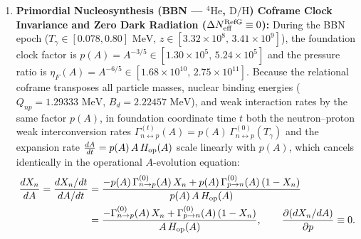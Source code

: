 \documentclass[11pt,a4paper]{article}
\begin{document}
\begin{enumerate}[label=\arabic*.]
\begin{equation}
\gamma(\Omega_m) = \frac{6}{11} + \frac{15}{2057}\bigl(1 - \Omega_m(A)\bigr) + \mathcal{O}\bigl((1 - \Omega_m)^2\bigr),
\end{equation}
with leading coefficient $\gamma_0 = \frac{6}{11} \approx 0.54545$ and first correction $\gamma_1 = \frac{15}{2057} \approx 0.007292$. At $z=0$, $\gamma(\Omega_{m0}) = 0.55045$, $f(0) = 0.52728$, and the redshift-space distortion (RSD) parameter is $f\sigma_8(0) = 0.42768$ ($\sigma_{8,0} = 0.8111$), matching SDSS/BOSS/eBOSS observations over $z \in [0.15, 1.48]$ with $\chi^2/\text{dof} = 1.179$.
\item \textbf{Primordial Nucleosynthesis (BBN --- $^4\mathrm{He}$, $\mathrm{D/H}$) Coframe Clock Invariance and Zero Dark Radiation ($\Delta N_{\rm eff}^{\rm RefG} \equiv 0$):} During the BBN epoch ($T_\gamma \in [0.078, 0.80]\text{ MeV}$, $z \in [3.32\times 10^8,\, 3.41\times 10^9]$), the foundation clock factor is $p(A) = A^{-3/5} \in [1.30\times 10^5,\, 5.24\times 10^5]$ and the pressure ratio is $\eta_F(A) = A^{-6/5} \in [1.68\times 10^{10},\, 2.75\times 10^{11}]$. Because the relational coframe transposes all particle masses, nuclear binding energies ($Q_{np} = 1.29333\text{ MeV}$, $B_d = 2.22457\text{ MeV}$), and weak interaction rates by the same factor $p(A)$, in foundation coordinate time $t$ both the neutron--proton weak interconversion rates $\Gamma_{n\leftrightarrow p}^{(t)}(A) = p(A)\,\Gamma_{n\leftrightarrow p}^{(0)}(T_\gamma)$ and the expansion rate $\frac{dA}{dt} = p(A)\,A\,H_{\rm op}(A)$ scale linearly with $p(A)$, which cancels identically in the operational $A$-evolution equation:
\begin{align}
\frac{dX_n}{dA}
= \frac{dX_n/dt}{dA/dt}
&= \frac{-p(A)\,\Gamma_{n\to p}^{(0)}(A)\,X_n + p(A)\,\Gamma_{p\to n}^{(0)}(A)\,(1 - X_n)}{p(A)\,A\,H_{\rm op}(A)} \nonumber\\
&= \frac{-\Gamma_{n\to p}^{(0)}(A)\,X_n + \Gamma_{p\to n}^{(0)}(A)\,(1 - X_n)}{A\,H_{\rm op}(A)},
\qquad
\frac{\partial(dX_n/dA)}{\partial p} \equiv 0.
\end{align}

\end{enumerate}
\end{document}
